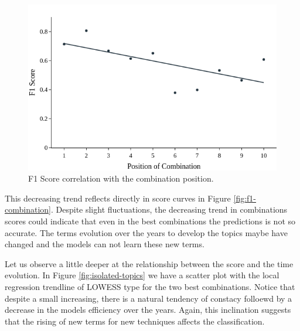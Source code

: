 \begin{figure}[h!]
	\centering
	\includegraphics[width=0.55\linewidth]{01.Chapters/05.Results/combination-corr}
	\caption{F1 Score correlation with the combination position.}
	\label{fig:combination-corr}
\end{figure}

This decreasing trend reflects directly in score curves in Figure \ref{fig:f1-combination}. Despite slight fluctuations, the decreasing trend in combinations scores could indicate that even in the best combinations the predictions is not so accurate. The terms evolution over the years to develop the topics maybe have changed and the models can not learn these new terms.

Let us observe a little deeper at the relationship between the score and the time evolution. In Figure \ref{fig:isolated-topics} we have a scatter plot with the local regression trendline of LOWESS type for the two best combinations. Notice that despite a small increasing, there is a natural tendency of constacy folloewd by a decrease in the models efficiency over the years. Again, this inclination suggests that the rising of new terms for new techniques affects the classification.

